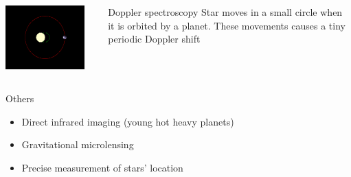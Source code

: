 \documentclass[aspectratio=169]{beamer}
\begin{document}
\begin{frame}
\begin{columns}
\includegraphics[width=0.90\textwidth]{img/Dopplerspectr-above.png}
\begin{block}{Doppler spectroscopy}
Star moves in a small circle when it is orbited by a planet. These movements causes
a tiny periodic Doppler shift 
\end{block}
\end{columns}
\begin{block}{Others}
\begin{itemize}
\item Direct infrared imaging (young hot heavy planets)
\item Gravitational microlensing
\item Precise measurement of stars' location
\end{itemize}
\end{block}
\end{frame}
\end{document}
